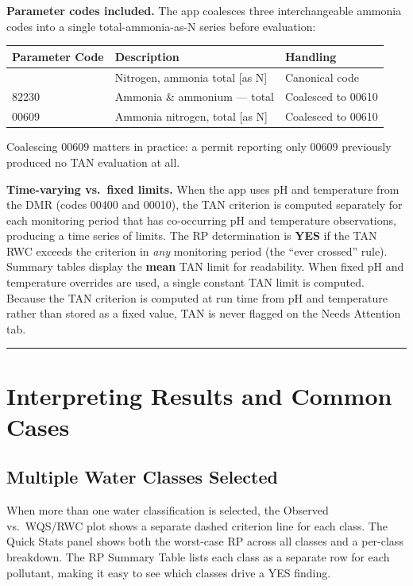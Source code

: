 \documentclass[
  11pt,
  letterpaper,
  DIV=11,
  numbers=noendperiod]{scrartcl}
\newcounter{none} %
\begin{document}
\textbf{Parameter codes included.} The app coalesces three
interchangeable ammonia codes into a single total-ammonia-as-N series
before evaluation:

{\def\LTcaptype{none} %
\begin{longtable}[]{@{}lll@{}}
\toprule\noalign{}
Parameter Code & Description & Handling \\
\midrule\noalign{}
\endhead
\bottomrule\noalign{}
\endlastfoot
00610 & Nitrogen, ammonia total {[}as N{]} & Canonical code \\
82230 & Ammonia \& ammonium --- total & Coalesced to 00610 \\
00609 & Ammonia nitrogen, total {[}as N{]} & Coalesced to 00610 \\
\end{longtable}
}

Coalescing 00609 matters in practice: a permit reporting only 00609
previously produced no TAN evaluation at all.

\textbf{Time-varying vs.~fixed limits.} When the app uses pH and
temperature from the DMR (codes 00400 and 00010), the TAN criterion is
computed separately for each monitoring period that has co-occurring pH
and temperature observations, producing a time series of limits. The RP
determination is \textbf{YES} if the TAN RWC exceeds the criterion in
\emph{any} monitoring period (the ``ever crossed'' rule). Summary tables
display the \textbf{mean} TAN limit for readability. When fixed pH and
temperature overrides are used, a single constant TAN limit is computed.
Because the TAN criterion is computed at run time from pH and
temperature rather than stored as a fixed value, TAN is never flagged on
the Needs Attention tab.

\begin{center}\rule{0.5\linewidth}{0.5pt}\end{center}

\section{Interpreting Results and Common
Cases}\label{sec-interpretation}

\subsection{Multiple Water Classes Selected}\label{sec-multi-class}

When more than one water classification is selected, the Observed
vs.~WQS/RWC plot shows a separate dashed criterion line for each class.
The Quick Stats panel shows both the worst-case RP across all classes
and a per-class breakdown. The RP Summary Table lists each class as a
separate row for each pollutant, making it easy to see which classes
drive a YES finding.
\end{document}
